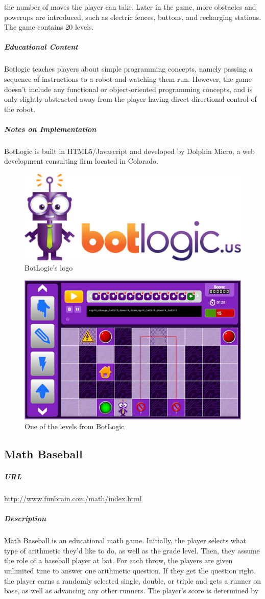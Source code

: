 the number of moves the player can take. Later in the game, more obstacles and powerups are introduced, such as electric fences, buttons, and recharging stations. The game contains 20 levels.\subparagraph{Educational Content}Botlogic teaches players about simple programming concepts, namely passing a sequence of instructions to a robot and watching them run. However, the game doesn't include any functional or object-oriented programming concepts, and is only slightly abstracted away from the player having direct directional control of the robot.\subparagraph{Notes on Implementation}BotLogic is built in HTML5/Javascript and developed by Dolphin Micro, a web development consulting firm located in Colorado.\newpage\begin{figure}[h!]\centering \includegraphics[height=0.33\textheight]{img/botlogic_title.jpg}\caption{BotLogic's logo}\end{figure}\begin{figure}[h!]\centering \includegraphics[height=0.33\textheight]{img/botlogic_screen.png}\caption{One of the levels from BotLogic}\end{figure}\subsection{Math Baseball}\subparagraph{URL}\url{http://www.funbrain.com/math/index.html}\subparagraph{Description}Math Baseball is an educational math game. Initially, the player selects what type of arithmetic they'd like to do, as well as the grade level. Then, they assume the role of a baseball player at bat. For each throw, the players are given unlimited time to answer one arithmetic question. If they get the question right, the player earns a randomly selected single, double, or triple and gets a runner on base, as well as advancing any other runners. The player's score is determined by 